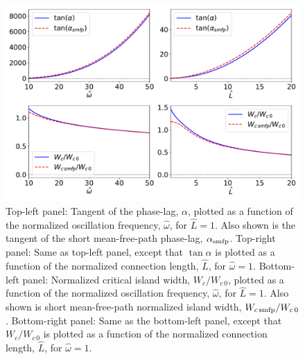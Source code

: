 \documentclass[12pt,prb,aps]{revtex4-1}
\begin{document}
\begin{figure}
\centerline{\includegraphics[width=1.0\textwidth]{smfp.pdf}}
\caption{Top-left panel: Tangent of the phase-lag, $\alpha$, plotted as a function of the normalized oscillation frequency, $\hat{\omega}$, for  $\hat{L}=1$. Also
shown is the tangent of the short mean-free-path phase-lag, $\alpha_{\rm smfp}$. Top-right panel: Same as top-left panel, except that
$\tan\alpha$ is plotted as a function of the normalized 
connection length, $\hat{L}$, for  $\hat{\omega}=1$.
Bottom-left panel: Normalized critical island width, $W_c/W_{c\,0}$,  plotted as a function of the normalized oscillation frequency, $\hat{\omega}$, for  $\hat{L}=1$. Also
shown is  short mean-free-path normalized island width, $W_{c\,{\rm smfp}}/W_{c\,0}$.  
Bottom-right panel: Same as the bottom-left panel, except that $W_c/W_{c\,0}$ is plotted as a function of the normalized 
connection length, $\hat{L}$, for  $\hat{\omega}=1$.
  \label{fig4}}
\end{figure}
\end{document}
